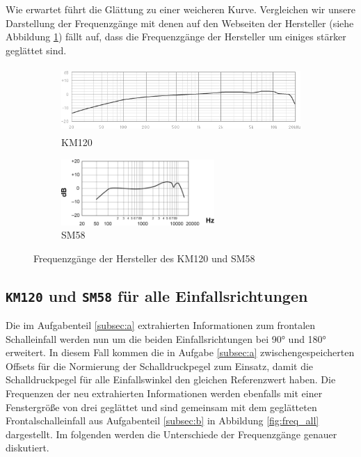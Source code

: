 Wie erwartet führt die Glättung zu einer weicheren Kurve. 
Vergleichen wir unsere Darstellung der Frequenzgänge mit denen auf den Webseiten der Hersteller (siehe Abbildung \ref{fig:freq_web}) fällt auf, dass die Frequenzgänge der Hersteller um einiges stärker geglättet sind.

\begin{figure}[bth]
    \centering
    \begin{subfigure}{.65\textwidth}
        \centering
        \caption{KM120 \cite{KM120}}
        \includegraphics[height=2.5cm]{Figures/km120_web.png}
    \end{subfigure}%
    \begin{subfigure}{.35\textwidth}
        \centering
        \caption{SM58 \cite{SM58}}
        \includegraphics[height=2.5cm]{Figures/sm58_web.png}
    \end{subfigure}
    \caption{Frequenzgänge der Hersteller des KM120 und SM58}
    \label{fig:freq_web}
\end{figure}


\subsection{\texttt{KM120} und \texttt{SM58} für alle Einfallsrichtungen}
\label{subsec:c}
Die im Aufgabenteil \ref{subsec:a} extrahierten Informationen zum frontalen Schalleinfall werden nun um die beiden Einfallsrichtungen bei 90° und 180° erweitert.
In diesem Fall kommen die in Aufgabe \ref{subsec:a} zwischengespeicherten Offsets für die Normierung der Schalldruckpegel zum Einsatz, damit die Schalldruckpegel für alle Einfallswinkel den gleichen Referenzwert haben.
Die Frequenzen der neu extrahierten Informationen werden ebenfalls mit einer Fenstergröße von drei geglättet und sind gemeinsam mit dem geglätteten Frontalschalleinfall aus Aufgabenteil \ref{subsec:b} in Abbildung \ref{fig:freq_all} dargestellt.
Im folgenden werden die Unterschiede der Frequenzgänge genauer diskutiert. 

